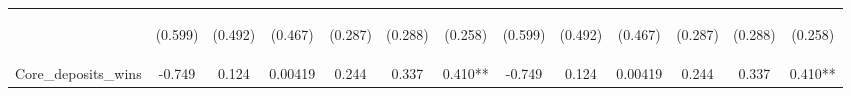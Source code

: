 \documentclass[]{article}
\begin{document}
\begin{center}
\begin{tabular}{lcccccccccccc}
\vspace{4pt} & \begin{footnotesize}(0.599)\end{footnotesize} & \begin{footnotesize}(0.492)\end{footnotesize} & \begin{footnotesize}(0.467)\end{footnotesize} & \begin{footnotesize}(0.287)\end{footnotesize} & \begin{footnotesize}(0.288)\end{footnotesize} & \begin{footnotesize}(0.258)\end{footnotesize} & \begin{footnotesize}(0.599)\end{footnotesize} & \begin{footnotesize}(0.492)\end{footnotesize} & \begin{footnotesize}(0.467)\end{footnotesize} & \begin{footnotesize}(0.287)\end{footnotesize} & \begin{footnotesize}(0.288)\end{footnotesize} & \begin{footnotesize}(0.258)\end{footnotesize} \\
Core\_deposits\_wins & -0.749 & 0.124 & 0.00419 & 0.244 & 0.337 & 0.410** & -0.749 & 0.124 & 0.00419 & 0.244 & 0.337 & 0.410** \\

\end{tabular}
\end{center}
\end{document}
